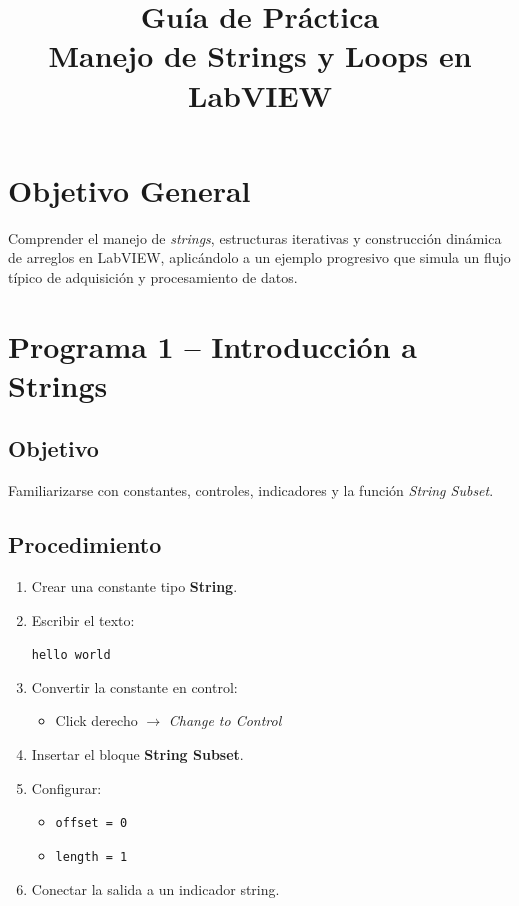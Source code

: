 \documentclass[12pt]{article}
\title{\textbf{Guía de Práctica}\\
Manejo de Strings y Loops en LabVIEW}
\author{}
\date{}
\begin{document}
\maketitle
\thispagestyle{empty}

\section*{Objetivo General}

Comprender el manejo de \textit{strings}, estructuras iterativas y construcción dinámica de arreglos en LabVIEW, aplicándolo a un ejemplo progresivo que simula un flujo típico de adquisición y procesamiento de datos.

\newpage

\section{Programa 1 – Introducción a Strings}

\subsection*{Objetivo}
Familiarizarse con constantes, controles, indicadores y la función \textit{String Subset}.

\subsection*{Procedimiento}

\begin{enumerate}
    \item Crear una constante tipo \textbf{String}.
    \item Escribir el texto:
    \begin{center}
        \texttt{hello world}
    \end{center}
    \item Convertir la constante en control:
    \begin{itemize}
        \item Click derecho $\rightarrow$ \textit{Change to Control}
    \end{itemize}
    \item Insertar el bloque \textbf{String Subset}.
    \item Configurar:
    \begin{itemize}
        \item \texttt{offset = 0}
        \item \texttt{length = 1}
    \end{itemize}
    \item Conectar la salida a un indicador string.
\end{enumerate}
\end{document}
